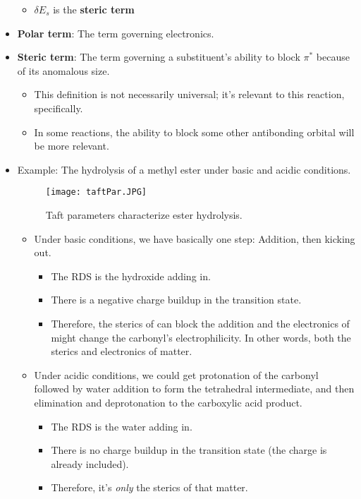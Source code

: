 \documentclass[../notes.tex]{subfiles}
\begin{document}
\begin{itemize}
\begin{itemize}
        \item $\delta E_s$ is the \textbf{steric term}
    \end{itemize}
    \item \textbf{Polar term}: The term governing electronics.
    \item \textbf{Steric term}: The term governing a substituent's ability to block $\pi^*$ because of its anomalous size.
    \begin{itemize}
        \item This definition is not necessarily universal; it's relevant to this reaction, specifically.
        \item In some reactions, the ability to block some other antibonding orbital will be more relevant.
    \end{itemize}
    \item Example: The hydrolysis of a methyl ester under basic and acidic conditions.
    \begin{figure}[H]
        \centering
        \texttt{[image: taftPar.JPG]}
        \caption{Taft parameters characterize ester hydrolysis.}
        \label{fig:taftPar}
    \end{figure}
    \begin{itemize}
        \item Under basic conditions, we have basically one step: Addition, then kicking out.
        \begin{itemize}
            \item The RDS is the hydroxide adding in.
            \item There is a negative charge buildup in the transition state.
            \item Therefore, the sterics of  can block the addition and the electronics of  might change the carbonyl's electrophilicity. In other words, both the sterics and electronics of  matter.
        \end{itemize}
        \item Under acidic conditions, we could get protonation of the carbonyl followed by water addition to form the tetrahedral intermediate, and then elimination and deprotonation to the carboxylic acid product.
        \begin{itemize}
            \item The RDS is the water adding in.
            \item There is no charge buildup in the transition state (the charge is already included).
            \item Therefore, it's \emph{only} the sterics of  that matter.

\end{itemize}
\end{itemize}
\end{itemize}
\end{document}
